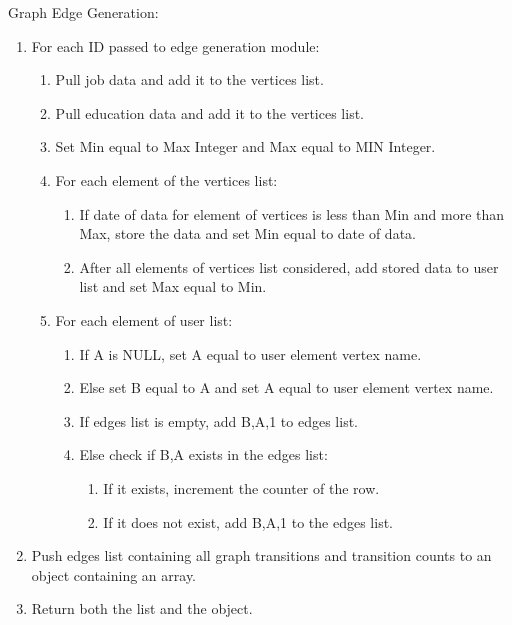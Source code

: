 \begin{description}
    \item[Graph Edge Generation:]
\end{description}
\begin{enumerate}
  \item For each ID passed to edge generation module:
  \begin{enumerate}
    \item Pull job data and add it to the vertices list.
    \item Pull education data and add it to the vertices list.
    \item Set Min equal to Max Integer and Max equal to MIN Integer.
    \item For each element of the vertices list:
    \begin{enumerate}
      \item If date of data for element of vertices is less than Min and more
      than Max, store the data and set Min equal to date of data.
      \item After all elements of vertices list considered, add stored data
      to user list and set Max equal to Min.
  	\end{enumerate}
  	\item For each element of user list:
  	\begin{enumerate}
  	  \item If A is NULL, set A equal to user element vertex name.
  	  \item Else set B equal to A and set A equal to user element vertex name.
  	  \item If edges list is empty, add B,A,1 to edges list.
  	  \item Else check if B,A exists in the edges list:
  	  \begin{enumerate}
  	    \item If it exists, increment the counter of the row.
  	    \item If it does not exist, add B,A,1 to the edges list.
  	  \end{enumerate}
  	\end{enumerate}
  \end{enumerate}
  \item Push edges list containing all graph transitions and transition
  counts to an object containing an array.
  \item Return both the list and the object.
\end{enumerate}

